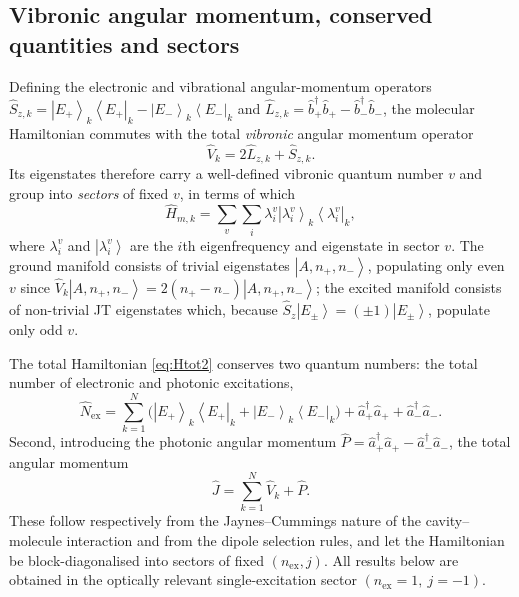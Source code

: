 \documentclass[12pt,a4paper]{article}
\newcommand{\ket}[1]{\left|#1\right\rangle}
\newcommand{\bra}[1]{\left\langle#1\right|}
\begin{document}
\subsection{Vibronic angular momentum, conserved quantities and sectors}

Defining the electronic and vibrational angular-momentum operators
$\hat S_{z,k}=\ket{E_+}_k\bra{E_+}_k-\ket{E_-}_k\bra{E_-}_k$ and
$\hat L_{z,k}=\hat b^\dagger_+\hat b_+-\hat b^\dagger_-\hat b_-$, the
molecular Hamiltonian commutes with the total \emph{vibronic} angular
momentum operator
\begin{equation}
  \hat V_k=2\hat L_{z,k}+\hat S_{z,k}.
  \label{eq:Vk}
\end{equation}
Its eigenstates therefore carry a well-defined vibronic quantum number $v$ and
group into \emph{sectors} of fixed $v$, in terms of which
\begin{equation}
  \hat H_{m,k}=\sum_{v}\sum_i \lambda^v_i\ket{\lambda^v_i}_k\bra{\lambda^v_i}_k,
  \label{eq:Hmk_diag}
\end{equation}
where $\lambda^v_i$ and $\ket{\lambda^v_i}$ are the $i$th eigenfrequency and
eigenstate in sector $v$. The ground manifold consists of trivial eigenstates
$\ket{A,n_+,n_-}$, populating only even $v$ since
$\hat V_k\ket{A,n_+,n_-}=2(n_+-n_-)\ket{A,n_+,n_-}$; the excited manifold
consists of non-trivial JT eigenstates which, because
$\hat S_z\ket{E_\pm}=(\pm1)\ket{E_\pm}$, populate only odd $v$.

The total Hamiltonian \eqref{eq:Htot2} conserves two quantum numbers: the
total number of electronic and photonic excitations,
\begin{equation}
  \hat N_{\mathrm{ex}}=\sum_{k=1}^{N}
    \big(\ket{E_+}_k\bra{E_+}_k+\ket{E_-}_k\bra{E_-}_k\big)
    +\hat a^\dagger_+\hat a_++\hat a^\dagger_-\hat a_-.
  \label{eq:Nex}
\end{equation}
Second, introducing the photonic angular momentum
$\hat P=\hat a^\dagger_+\hat a_+-\hat a^\dagger_-\hat a_-$, the total angular
momentum
\begin{equation}
  \hat J=\sum_{k=1}^{N}\hat V_k+\hat P .
  \label{eq:Jtot2}
\end{equation}
These follow respectively from the Jaynes--Cummings nature of the
cavity--molecule interaction and from the dipole selection rules, and let the
Hamiltonian be block-diagonalised into sectors of fixed
$(n_{\mathrm{ex}},j)$. All results below are obtained in the optically relevant
single-excitation sector $(n_{\mathrm{ex}}=1,\ j=-1)$.
\end{document}
